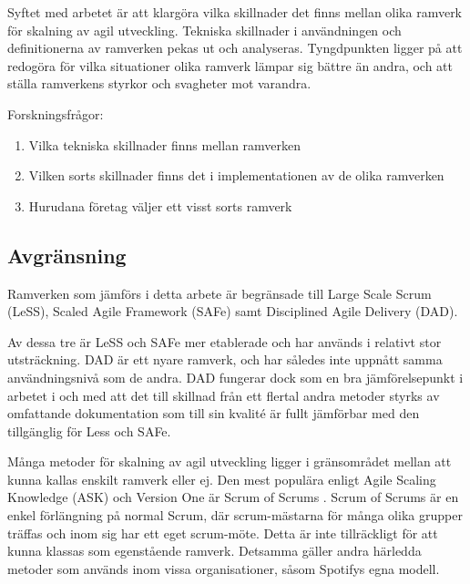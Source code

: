 		Syftet med arbetet är att klargöra vilka skillnader det finns mellan olika ramverk för skalning av agil utveckling. Tekniska skillnader i användningen och definitionerna av ramverken pekas ut och analyseras.
		Tyngdpunkten ligger på att redogöra för vilka situationer olika ramverk lämpar sig bättre än andra, och att ställa ramverkens styrkor och svagheter mot varandra. \newline
		
		
		Forskningsfrågor:
		\begin{enumerate}
			\item Vilka tekniska skillnader finns mellan ramverken
			\item Vilken sorts skillnader finns det i implementationen av de olika ramverken
			\item Hurudana företag väljer ett visst sorts ramverk
			
		\end{enumerate}
			
	
	\subsection{Avgränsning}
	
		Ramverken som jämförs i detta arbete är begränsade till Large Scale Scrum (LeSS), Scaled Agile Framework (SAFe) samt Disciplined Agile Delivery (DAD).
		
		Av dessa tre är LeSS och SAFe mer etablerade och har används i relativt stor utsträckning. DAD är ett nyare ramverk, och har således inte uppnått samma användningsnivå som de andra. DAD fungerar dock som en bra jämförelsepunkt i arbetet i och med att det till skillnad från ett flertal andra metoder styrks av omfattande dokumentation som till sin kvalité är fullt jämförbar med den tillgänglig för Less och SAFe.
		\cite{ask_matrix}
		
		Många metoder för skalning av agil utveckling ligger i gränsområdet mellan att kunna kallas enskilt ramverk eller ej. Den mest populära enligt Agile Scaling Knowledge (ASK) och Version One är Scrum of Scrums \cite{ask_matrix} \cite{version_one_report}. Scrum of Scrums är en enkel förlängning på normal Scrum, där scrum-mästarna för många olika grupper träffas och inom sig har ett eget scrum-möte. Detta är inte tillräckligt för att kunna klassas som egenstående ramverk. Detsamma gäller andra härledda metoder som används inom vissa organisationer, såsom Spotifys egna modell.
		
